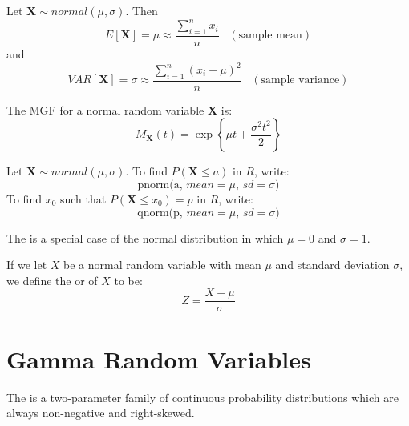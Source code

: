 \documentclass[12pt]{report}
\begin{document}
\begin{defn}{}{}
    Let $\mathbf{X}\sim normal(\mu,\sigma)$. Then \begin{equation*}
        E[\mathbf{X}] = \mu \approx \frac{\sum_{i=1}^nx_i}{n}\;\;\;(\text{sample mean})
    \end{equation*}
    and
    \begin{equation*}
        VAR[\mathbf{X}] = \sigma \approx \frac{\sum_{i=1}^n(x_i-\mu)^2}{n}\;\;\;(\text{sample variance})
    \end{equation*}
\end{defn}


\begin{defn}{}{}
    The MGF for a normal random variable $\mathbf{X}$ is: \begin{equation*}
        M_{\mathbf{X}}(t) = \operatorname{exp}\left\{\mu t + \frac{\sigma^2t^2}{2}\right\}
    \end{equation*}
\end{defn}


\begin{defn}{}{}
    Let $\mathbf{X}\sim normal(\mu,\sigma)$. To find $P(\mathbf{X} \leq a)$ in $R$, write: \begin{equation*}
        \text{pnorm(a, $mean = \mu$, $sd = \sigma$)}
    \end{equation*}
    To find $x_0$ such that $P(\mathbf{X} \leq x_0) = p$ in $R$, write: \begin{equation*}
        \text{qnorm(p, $mean = \mu$, $sd = \sigma$)}
    \end{equation*}
\end{defn}

\begin{defn}{}{}
    The  is a special case of the normal distribution in which $\mu = 0$ and $\sigma = 1$. 

    If we let $X$ be a normal random variable with mean $\mu$ and standard deviation $\sigma$, we define the  or  of $X$ to be: \begin{equation*}
        Z = \frac{X-\mu}{\sigma}
    \end{equation*}
\end{defn}

\section{Gamma Random Variables}

\begin{defn}{}{}
    The  is a two-parameter family of continuous probability distributions which are always non-negative and right-skewed.
\end{defn}
\end{document}

